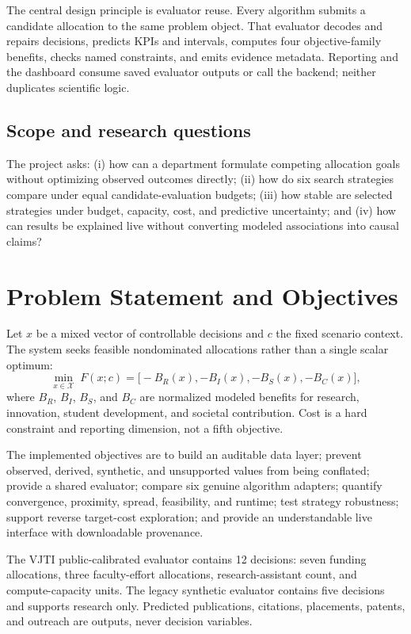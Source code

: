 \documentclass[12pt,a4paper]{report}
\begin{document}
The central design principle is evaluator reuse. Every algorithm submits a candidate allocation to the same problem object. That evaluator decodes and repairs decisions, predicts KPIs and intervals, computes four objective-family benefits, checks named constraints, and emits evidence metadata. Reporting and the dashboard consume saved evaluator outputs or call the backend; neither duplicates scientific logic.

\section{Scope and research questions}
The project asks: (i) how can a department formulate competing allocation goals without optimizing observed outcomes directly; (ii) how do six search strategies compare under equal candidate-evaluation budgets; (iii) how stable are selected strategies under budget, capacity, cost, and predictive uncertainty; and (iv) how can results be explained live without converting modeled associations into causal claims?

\chapter{Problem Statement and Objectives}
Let $x$ be a mixed vector of controllable decisions and $c$ the fixed scenario context. The system seeks feasible nondominated allocations rather than a single scalar optimum:
\begin{equation}
\min_{x\in\mathcal{X}}\;F(x;c)=\big[-B_R(x),-B_I(x),-B_S(x),-B_C(x)\big],
\end{equation}
where $B_R$, $B_I$, $B_S$, and $B_C$ are normalized modeled benefits for research, innovation, student development, and societal contribution. Cost is a hard constraint and reporting dimension, not a fifth objective.

The implemented objectives are to build an auditable data layer; prevent observed, derived, synthetic, and unsupported values from being conflated; provide a shared evaluator; compare six genuine algorithm adapters; quantify convergence, proximity, spread, feasibility, and runtime; test strategy robustness; support reverse target-cost exploration; and provide an understandable live interface with downloadable provenance.

The VJTI public-calibrated evaluator contains 12 decisions: seven funding allocations, three faculty-effort allocations, research-assistant count, and compute-capacity units. The legacy synthetic evaluator contains five decisions and supports research only. Predicted publications, citations, placements, patents, and outreach are outputs, never decision variables.
\end{document}
